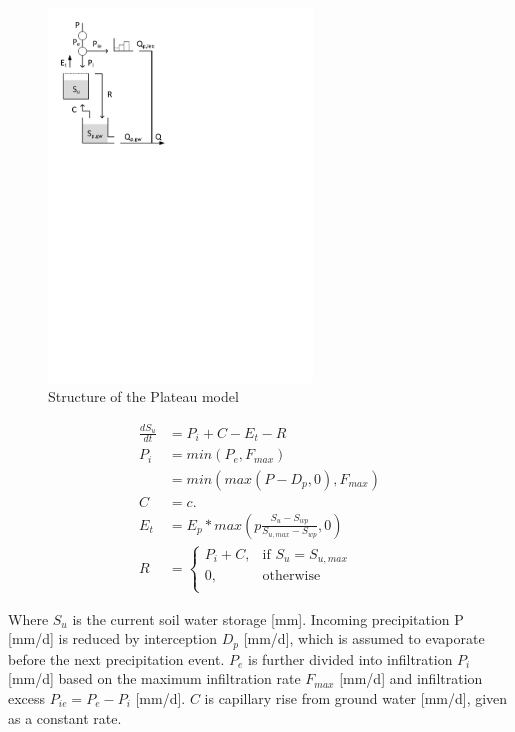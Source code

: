 { 																	%
\begin{figure}
\includegraphics[trim=1cm 19cm 9cm 1cm,width=7cm,keepaspectratio]{./AppA_files/15_schematic.pdf}
\caption{Structure of the Plateau model} \label{fig:15_schematic}
\end{figure}

\begin{align}
	\frac{dS_u}{dt} &= P_i+C-E_t-R \\
	P_i &= min(P_e,F_{max})\\
		& = min\left(max(P-D_p,0),F_{max}\right)\\
	C &= c.\\
	E_t &= E_p*max\left(p\frac{S_u-S_{wp}}{S_{u,max}-S_{wp}},0\right)\\
	R &=	\begin{cases}
		P_i+C, & \text{if } S_u = S_{u,max} \\
		0, & \text{otherwise}\\
	\end{cases}
\end{align}

Where $S_u$ is the current soil water storage [mm]. Incoming precipitation P [mm/d] is reduced by interception $D_p$ [mm/d], which is assumed to evaporate before the next precipitation event. $P_e$ is further divided into infiltration $P_i$ [mm/d] based on the maximum infiltration rate $F_{max}$ [mm/d] and infiltration excess $P_{ie} = P_e-P_i$ [mm/d]. $C$ is capillary rise from ground water [mm/d], given as a constant rate.

 } %

